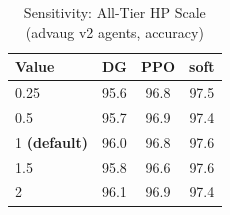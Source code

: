 \begin{table}[h]
\centering
\caption{Sensitivity: All-Tier HP Scale (advaug v2 agents, accuracy)}
\label{tab:sensitivity_all_honeypot_rates}
\begin{tabular}{lccc}
\toprule
Value & DG & PPO & soft \\
\midrule
  0.25 & 95.6 & 96.8 & 97.5 \\
  0.5 & 95.7 & 96.9 & 97.4 \\
  1 \textbf{(default)} & 96.0 & 96.8 & 97.6 \\
  1.5 & 95.8 & 96.6 & 97.6 \\
  2 & 96.1 & 96.9 & 97.4 \\
\bottomrule
\end{tabular}
\end{table}